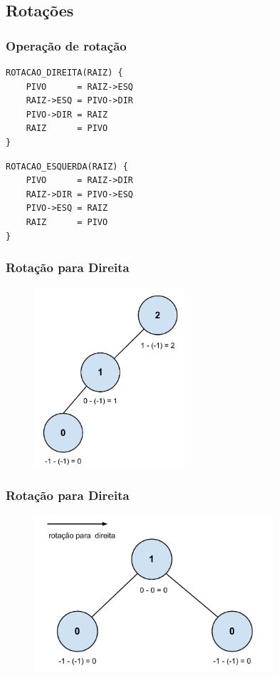 \subsection{Rotações}

\begin{frame}[fragile]
\frametitle{Operação de rotação}

\begin{verbatim}
ROTACAO_DIREITA(RAIZ) {
    PIVO      = RAIZ->ESQ
    RAIZ->ESQ = PIVO->DIR
    PIVO->DIR = RAIZ
    RAIZ      = PIVO
}
\end{verbatim}

\begin{verbatim}
ROTACAO_ESQUERDA(RAIZ) {
    PIVO      = RAIZ->DIR
    RAIZ->DIR = PIVO->ESQ
    PIVO->ESQ = RAIZ
    RAIZ      = PIVO
}
\end{verbatim}
\end{frame}

\begin{frame}
    \frametitle{Rotação para Direita}
    
    \begin{figure}[tbp]
    \includegraphics[keepaspectratio=true,width=2.2in]{figs/fig_arvores/Balanceamento_Arvore2}
    \centering
    \end{figure}
\end{frame}

\begin{frame}
    \frametitle{Rotação para Direita}
    
    \begin{figure}[tbp]
    \includegraphics[keepaspectratio=true,width=3.5in]{figs/fig_arvores/Balanceamento_Arvore3}
    \centering
    \end{figure}
\end{frame}

